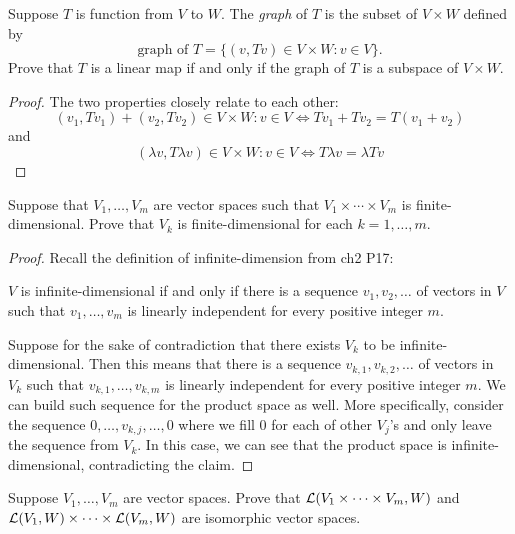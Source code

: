 \documentclass{extarticle}
\begin{document}
\begin{problem}{1}
    Suppose \(T\) is function from \(V\) to \(W\). The \emph{graph} of \(T\) is the subset of \(V \times W\)
    defined by 
    \[\text{graph of } T = \{(v, Tv) \in V \times W \colon v \in V\}.\]
    Prove that \(T\) is a linear map if and only if the graph of \(T\) is a subspace of \(V \times W\). 
\end{problem}

\begin{proof}
The two properties closely relate to each other:
\[(v_1, Tv_1) + (v_2, Tv_2) \in V \times W \colon v \in V \Longleftrightarrow Tv_1 + Tv_2 = T(v_1 + v_2)\]
and 
\[(\lambda v, T \lambda v) \in V \times W \colon v \in V \Longleftrightarrow T \lambda v = \lambda T v\]
\end{proof}

\begin{problem}{2}
    Suppose that \(V_1, \ldots, V_m\) are vector spaces such that \(V_1 \times \cdots \times V_m\) 
    is finite-dimensional. Prove that \(V_k\) is finite-dimensional for each \(k = 1,\ldots,m\).
\end{problem}

\begin{proof}
    Recall the definition of infinite-dimension from ch2 P17:

    \begin{center}
        \(V\) is infinite-dimensional if and only if there is a sequence 
        \(v_1, v_2, \ldots\) of vectors in \(V\) such that \(v_1, \ldots, v_m\)
        is linearly independent for every positive integer \(m\). 
    \end{center}

    Suppose for the sake of contradiction that there exists \(V_k\) to be infinite-dimensional. Then 
    this means that there is a sequence \(v_{k, 1}, v_{k, 2}, \ldots\) of vectors in \(V_k\) such 
    that \(v_{k, 1}, \ldots, v_{k, m}\) is linearly independent for every positive integer \(m\). 
    We can build such sequence for the product space as well. More specifically, consider the sequence 
    \(0, \ldots, v_{k, j}, \ldots, 0\) where we fill 0 for each of other \(V_j\)'s and only leave the 
    sequence from \(V_k\). In this case, we can see that the product space is infinite-dimensional, 
    contradicting the claim. 
\end{proof}

\begin{problem}{3}
    Suppose \(V_1, \ldots, V_m\) are vector spaces. Prove that \(\mathcal{L}(V_1 \times \cdots \times V_m, W)\)
    and \(\mathcal{L}(V_1, W) \times \cdots \times \mathcal{L}(V_m, W)\) are isomorphic vector spaces. 
\end{problem}
\end{document}
